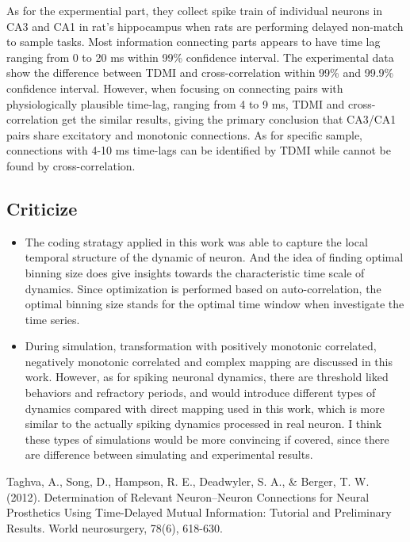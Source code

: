 \documentclass{article}[12pt]
\begin{document}
As for the expermential part, they collect spike train of individual neurons in CA3 and CA1 in rat's hippocampus when rats are performing delayed non-match to sample tasks. Most information connecting parts appears to have time lag ranging from 0 to 20 ms within 99\% confidence interval. The experimental data show the difference between TDMI and cross-correlation within 99\% and 99.9\% confidence interval. However, when focusing on connecting pairs with physiologically plausible time-lag, ranging from 4 to 9 ms, TDMI and cross-correlation get the similar results, giving the primary conclusion that CA3/CA1 pairs share excitatory and monotonic connections. As for specific sample, connections with 4-10 ms time-lags can be identified by TDMI while cannot be found by cross-correlation.

\subsection{Criticize}
\begin{itemize}
	\item The coding stratagy applied in this work was able to capture the local temporal structure of the dynamic of neuron. And the idea of finding optimal binning size does give insights towards the characteristic time scale of dynamics. Since optimization is performed based on auto-correlation, the optimal binning size stands for the optimal time window when investigate the time series.
	\item During simulation, transformation with positively monotonic correlated, negatively monotonic correlated and complex mapping are discussed in this work. However, as for spiking neuronal dynamics, there are threshold liked behaviors and refractory periods, and would introduce different types of dynamics compared with direct mapping used in this work, which is more similar to the actually spiking dynamics processed in real neuron. I think these types of simulations would be more convincing if covered, since there are difference between simulating and experimental results.
\end{itemize}

\begin{thebibliography}{0}
	Taghva, A., Song, D., Hampson, R. E., Deadwyler, S. A., \& Berger, T. W. (2012). Determination of Relevant Neuron–Neuron Connections for Neural Prosthetics Using Time-Delayed Mutual Information: Tutorial and Preliminary Results. World neurosurgery, 78(6), 618-630.
\end{thebibliography}
\end{document}
